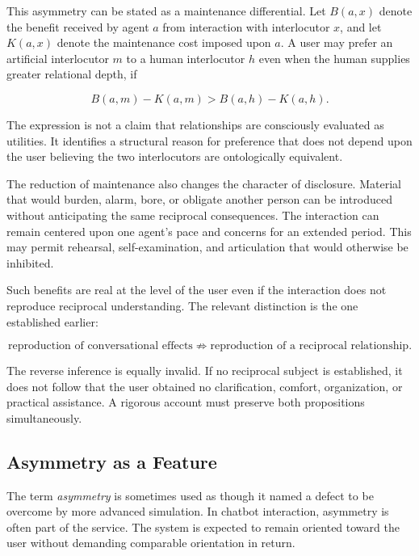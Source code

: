 \documentclass[11pt]{article}
\newcommand{\term}[1]{\emph{#1}}
\begin{document}
This asymmetry can be stated as a maintenance differential. Let
\(B(a,x)\) denote the benefit received by agent \(a\) from interaction with
interlocutor \(x\), and let \(K(a,x)\) denote the maintenance cost imposed upon
\(a\). A user may prefer an artificial interlocutor \(m\) to a human
interlocutor \(h\) even when the human supplies greater relational depth, if

\begin{equation}
  B(a,m)-K(a,m)
  >
  B(a,h)-K(a,h).
  \label{eq:maintenance-differential}
\end{equation}

The expression is not a claim that relationships are consciously evaluated as
utilities. It identifies a structural reason for preference that does not
depend upon the user believing the two interlocutors are ontologically
equivalent.

The reduction of maintenance also changes the character of disclosure.
Material that would burden, alarm, bore, or obligate another person can be
introduced without anticipating the same reciprocal consequences. The
interaction can remain centered upon one agent's pace and concerns for an
extended period. This may permit rehearsal, self-examination, and articulation
that would otherwise be inhibited.

Such benefits are real at the level of the user even if the interaction does
not reproduce reciprocal understanding. The relevant distinction is the one
established earlier:

\begin{equation}
  \text{reproduction of conversational effects}
  \not\Rightarrow
  \text{reproduction of a reciprocal relationship}.
  \label{eq:conversational-effect}
\end{equation}

The reverse inference is equally invalid. If no reciprocal subject is
established, it does not follow that the user obtained no clarification,
comfort, organization, or practical assistance. A rigorous account must
preserve both propositions simultaneously.

\subsection{Asymmetry as a Feature}

The term \term{asymmetry} is sometimes used as though it named a defect to be
overcome by more advanced simulation. In chatbot interaction, asymmetry is
often part of the service. The system is expected to remain oriented toward
the user without demanding comparable orientation in return.
\end{document}
